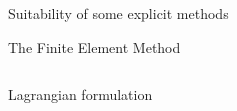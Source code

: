 \begin{withoutheadline}
\begin{frame}{Suitability of some explicit methods}
\begin{block}{The Finite Element Method \cite{Belytschko}}
\begin{overprint}
\begin{columns}
\begin{footnotesize}
          \end{footnotesize}
        \end{columns}
        \vskip -10pt
        \begin{columns}
          \begin{column}{0.48\textwidth}
            \begin{block}{\footnotesize Lagrangian formulation}
              \centering
                
            \end{block}
          \end{column}
          \begin{column}{0.48\textwidth}
            
          \end{column}
        \end{columns}
      \end{overprint}
    \end{block}
  \end{frame}
\end{withoutheadline}

